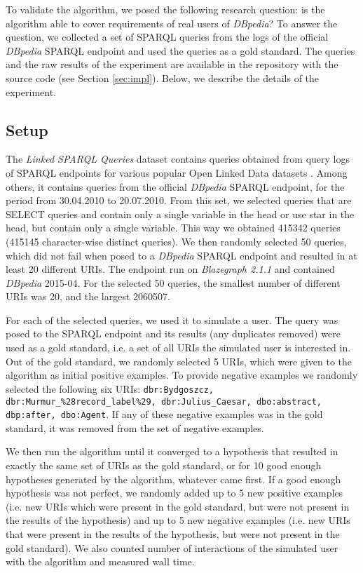 \documentclass{llncs}
\begin{document}
To validate the algorithm, we posed the following research question: is the algorithm able to cover requirements of real users of \emph{DBpedia}?
To answer the question, we collected a set of SPARQL queries from the logs of the official \emph{DBpedia} SPARQL endpoint and used the queries as a gold standard.
The queries and the raw results of the experiment are available in the repository with the source code (see Section \ref{sec:impl}).
Below, we describe the details of the experiment.

\subsection{Setup}

The \emph{Linked SPARQL Queries} dataset contains queries obtained from query logs of SPARQL endpoints for various popular Open Linked Data datasets  \cite{DBLP:conf/semweb/SaleemAHMN15}.
Among others, it contains queries from the official \emph{DBpedia} SPARQL endpoint, for the period from 30.04.2010 to 20.07.2010.
From this set, we selected queries that are SELECT queries and contain only a single variable in the head or use star in the head, but contain only a single variable.
This way we obtained 415342 queries (415145 character-wise distinct queries).
We then randomly selected 50 queries, which did not fail when posed to a \emph{DBpedia} SPARQL endpoint and resulted in at least 20 different URIs.
The endpoint run on \emph{Blazegraph 2.1.1} and contained \emph{DBpedia} 2015-04.
For the selected 50 queries, the smallest number of different URIs was 20, and the largest 2060507.

For each of the selected queries, we used it to simulate a user.
The query was posed to the SPARQL endpoint and its results (any duplicates removed) were used as a gold standard, i.e. a set of all URIs the simulated user is interested in.
Out of the gold standard, we randomly selected 5 URIs, which were given to the algorithm as initial positive examples.
To provide negative examples we randomly selected the following six URIs: \texttt{dbr:Bydgoszcz, dbr:Murmur\_\%28record\_label\%29, dbr:Julius\_Caesar, dbo:abstract, dbp:after, dbo:Agent}.
If any of these negative examples was in the gold standard, it was removed from the set of negative examples.

We then run the algorithm until it converged to a hypothesis that resulted in exactly the same set of URIs as the gold standard, or for 10 good enough hypotheses generated by the algorithm, whatever came first.
If a good enough hypothesis was not perfect, we randomly added up to 5 new positive examples (i.e. new URIs which were present in the gold standard, but were not present in the results of the hypothesis) and up to 5 new negative examples (i.e. new URIs that were present in the results of the hypothesis, but were not present in the gold standard).
We also counted number of interactions of the simulated user with the algorithm and measured wall time.
\end{document}
